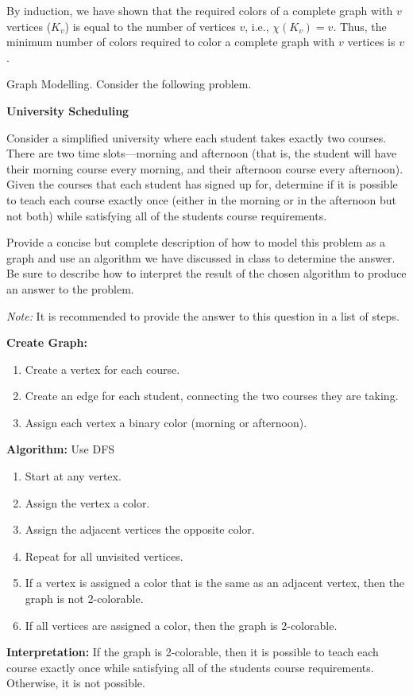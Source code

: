 \documentclass[12pt]{exam}
\newcommand{\stars}[1]{%
    \foreach \n in {1,...,#1}{%
        $\filledstar$%
    }%
}
\begin{document}
\begin{questions}
\begin{parts}
        By induction, we have shown that the required colors of a complete graph with $v$ vertices ($K_v$) is equal to the number of vertices $v$, i.e., $\chi(K_v) = v$. Thus, the minimum number of colors required to color a complete graph with $v$ vertices is $v$.




    \end{parts}

    \clearpage

    \question[30] [W2, \stars{4}] Graph Modelling. Consider the following problem.
    \begin{mdframed}
        \textbf{University Scheduling}

        Consider a simplified university where each student takes exactly two courses. There are two time slots—morning and afternoon (that is, the student will have their morning course every morning, and their afternoon course every afternoon). Given the courses that each student has signed up for, determine if it is possible to teach each course exactly once (either in the morning or in the afternoon but not both) while satisfying all of the students course requirements.
    \end{mdframed}

    Provide a concise but complete description of how to model this problem as a graph and use an algorithm we have discussed in class to determine the answer. Be sure to describe how to interpret the result of the chosen algorithm to produce an answer to the problem.

    \textit{Note:} It is recommended to provide the answer to this question in a list of steps.

    \textbf{Create Graph:}
    \begin{enumerate}
        \item Create a vertex for each course.
        \item Create an edge for each student, connecting the two courses they are taking.
        \item Assign each vertex a binary color (morning or afternoon).
    \end{enumerate}

    \textbf{Algorithm:} Use DFS
    \begin{enumerate}
        \item Start at any vertex.
        \item Assign the vertex a color.
        \item Assign the adjacent vertices the opposite color.
        \item Repeat for all unvisited vertices.
        \item If a vertex is assigned a color that is the same as an adjacent vertex, then the graph is not 2-colorable.
        \item If all vertices are assigned a color, then the graph is 2-colorable.
    \end{enumerate}

    \textbf{Interpretation:} If the graph is 2-colorable, then it is possible to teach each course exactly once while satisfying all of the students course requirements. Otherwise, it is not possible.

\end{questions}
\end{document}
